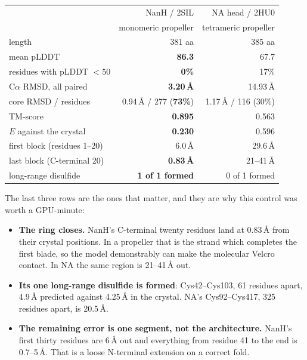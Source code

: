 \documentclass[11pt,a4paper]{article}
\begin{document}
\begin{center}
\begin{tabular}{lrr}
\toprule
 & NanH / 2SIL & NA head / 2HU0 \\
 & monomeric propeller & tetrameric propeller \\
\midrule
length                            & 381 aa & 385 aa \\
mean pLDDT                        & \textbf{86.3} & 67.7 \\
residues with pLDDT $<50$         & \textbf{0\%}  & 17\% \\
C$\alpha$ RMSD, all paired        & \textbf{3.20\,\AA} & 14.93\,\AA \\
core RMSD / residues              & 0.94\,\AA{} / 277 (\textbf{73\%}) & 1.17\,\AA{} / 116 (30\%) \\
TM-score                          & \textbf{0.895} & 0.563 \\
$E$ against the crystal           & \textbf{0.230} & 0.596 \\
first block (residues 1--20)      & 6.0\,\AA  & 29.6\,\AA \\
last block (C-terminal 20)        & \textbf{0.83\,\AA} & 21--41\,\AA \\
long-range disulfide              & \textbf{1 of 1 formed} & 0 of 1 formed \\
\bottomrule
\end{tabular}
\end{center}

The last three rows are the ones that matter, and they are why this control was
worth a GPU-minute:

\begin{itemize}
  \item \textbf{The ring closes.} NanH's C-terminal twenty residues land at
        0.83\,\AA{} from their crystal positions. In a propeller that is the
        strand which completes the first blade, so the model demonstrably can
        make the molecular Velcro contact. In NA the same region is 21--41\,\AA{}
        out.
  \item \textbf{Its one long-range disulfide is formed}: Cys42--Cys103, 61
        residues apart, 4.9\,\AA{} predicted against 4.25\,\AA{} in the crystal.
        NA's Cys92--Cys417, 325 residues apart, is 20.5\,\AA.
  \item \textbf{The remaining error is one segment, not the architecture.} NanH's
        first thirty residues are 6\,\AA{} out and everything from residue 41 to
        the end is 0.7--5\,\AA. That is a loose N-terminal extension on a correct
        fold.
\end{itemize}
\end{document}
